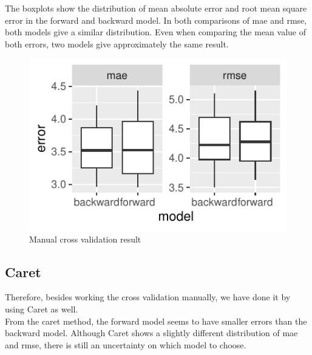 \documentclass[letterpaper,9pt,twocolumn,twoside,]{pinp}
\begin{document}
The boxplots show the distribution of mean absolute error and root mean
square error in the forward and backward model. In both comparisons of
mae and rmse, both models give a similar distribution. Even when
comparing the mean value of both errors, two models give approximately
the same result.

\begin{figure}

{\centering \includegraphics{Report_012E01_files/figure-latex/boxplot-1} 

}

\caption{Manual cross validation result}\label{fig:boxplot}
\end{figure}

\hypertarget{caret}{%
\subsection{Caret}\label{caret}}

Therefore, besides working the cross validation manually, we have done
it by using Caret as well.\\
From the caret method, the forward model seems to have smaller errors
than the backward model. Although Caret shows a slightly different
distribution of mae and rmse, there is still an uncertainty on which
model to choose.
\end{document}
